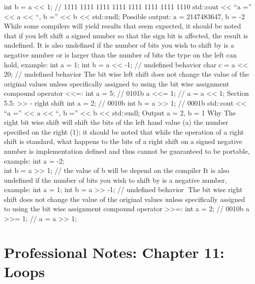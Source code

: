 int b = a \textless\textless{} 1; // 1111 1111 1111 1111 1111 1111 1111
1110 std::cout \textless\textless{} ``a ='' \textless\textless{} a
\textless\textless{} ``, b ='' \textless\textless{} b
\textless\textless{} std::endl; Possible output: a = 2147483647, b = -2
While some compilers will yield results that seem expected, it should be
noted that if you left shift a signed number so that the sign bit is
aﬀected, the result is undeﬁned. It is also undeﬁned if the number of
bits you wish to shift by is a negative number or is larger than the
number of bits the type on the left can hold, example: int a = 1; int b
= a \textless\textless{} -1; // undefined behavior char c = a
\textless\textless{} 20; // undefined behavior The bit wise left shift
does not change the value of the original values unless speciﬁcally
assigned to using the bit wise assignment compound operator
\textless\textless=: int a = 5; // 0101b a \textless\textless= 1; // a =
a \textless\textless{} 1; Section 5.5: \textgreater\textgreater{} -
right shift int a = 2; // 0010b int b = a \textgreater\textgreater{} 1;
// 0001b std::cout \textless\textless{} ``a ='' \textless\textless{} a
\textless\textless{} ``, b ='' \textless\textless{} b
\textless\textless{} std::endl; Output a = 2, b = 1 Why The right bit
wise shift will shift the bits of the left hand value (a) the number
speciﬁed on the right (1); it should be noted that while the operation
of a right shift is standard, what happens to the bits of a right shift
on a signed negative number is implementation deﬁned and thus cannot be
guaranteed to be portable, example: int a = -2;\\
int b = a \textgreater\textgreater{} 1; // the value of b will be depend
on the compiler It is also undeﬁned if the number of bits you wish to
shift by is a negative number, example: int a = 1; int b = a
\textgreater\textgreater{} -1; // undefined behavior The bit wise right
shift does not change the value of the original values unless
speciﬁcally assigned to using the bit wise assignment compound operator
\textgreater\textgreater=: int a = 2; // 0010b a
\textgreater\textgreater= 1; // a = a \textgreater\textgreater{} 1;

\hypertarget{professional-notes-chapter-11-loops}{%
\chapter{Professional Notes: Chapter 11:
Loops}\label{professional-notes-chapter-11-loops}}

